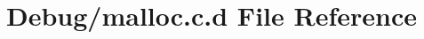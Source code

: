 \hypertarget{_debug_2malloc_8c_8d}{\section{\-Debug/malloc.c.\-d \-File \-Reference}
\label{_debug_2malloc_8c_8d}
}
